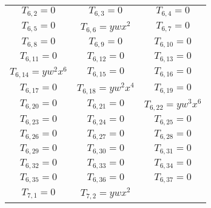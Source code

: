 \begin{longtable}{|c|c|c|}
$T_{6,2}= 0$&

$T_{6,3}= 0$&

$T_{6,4}= 0$\\

$T_{6,5}= 0$&

$T_{6,6}= ywx^2$&

$T_{6,7}= 0$\\

$T_{6,8}= 0$&

$T_{6,9}= 0$&

$T_{6,10}= 0$\\

$T_{6,11}= 0$&

$T_{6,12}= 0$&

$T_{6,13}= 0$\\

$T_{6,14}= yw^2x^6$&

$T_{6,15}= 0$&

$T_{6,16}= 0$\\

$T_{6,17}= 0$&

$T_{6,18}= yw^2x^4$&

$T_{6,19}= 0$\\

$T_{6,20}= 0$&

$T_{6,21}= 0$&

$T_{6,22}= yw^3x^6$\\

$T_{6,23}= 0$&

$T_{6,24}= 0$&

$T_{6,25}= 0$\\

$T_{6,26}= 0$&

$T_{6,27}= 0$&

$T_{6,28}= 0$\\

$T_{6,29}= 0$&

$T_{6,30}= 0$&

$T_{6,31}= 0$\\

$T_{6,32}= 0$&

$T_{6,33}= 0$&

$T_{6,34}= 0$\\

$T_{6,35}= 0$&

$T_{6,36}= 0$&

$T_{6,37}= 0$\\

$T_{7,1}= 0$&

$T_{7,2}= ywx^2$&


\end{longtable}
